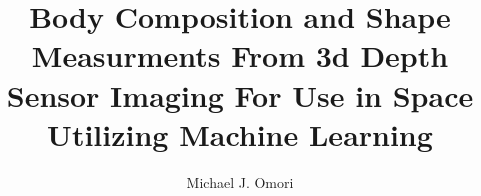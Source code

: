 \documentclass[11pt]{uhthesis}
\title{Body Composition and Shape Measurments From 3d Depth Sensor Imaging For Use in Space Utilizing Machine Learning}
\author{Michael J. Omori}
\begin{document}
\maketitle

\begin{frontmatter}


\copyrightpage







\tableofcontents

\listoftables

\listoffigures

\end{frontmatter}



\appendix



\nocite{*}



%
\end{document}
